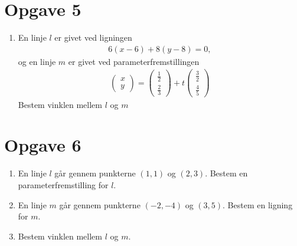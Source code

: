 \section*{Opgave 5}
\begin{enumerate}[label=\roman*)]
	\item En linje $l$ er givet ved ligningen
	\begin{align*}
		6(x-6) + 8(y-8) = 0,
	\end{align*}
	og en linje $m$ er givet ved parameterfremstillingen
	\begin{align*}
		\begin{pmatrix}
			x \\ y
		\end{pmatrix} = 
		\begin{pmatrix}
			\frac{1}{2} \\ \frac{2}{3}
		\end{pmatrix} + t
		\begin{pmatrix}
			\frac{3}{2} \\ \frac{4}{5}
		\end{pmatrix}
	\end{align*}
	Bestem vinklen mellem $l$ og $m$
\end{enumerate}

\section*{Opgave 6}
\begin{enumerate}[label=\roman*)]
	\item En linje $l$ går gennem punkterne $(1,1)$ og $(2,3)$. Bestem en parameterfremstilling for 
	$l$. 
	\item En linje $m$ går gennem punkterne $(-2,-4)$ og $(3,5)$. Bestem en ligning for $m$.
	\item Bestem vinklen mellem $l$ og $m$.
\end{enumerate}
